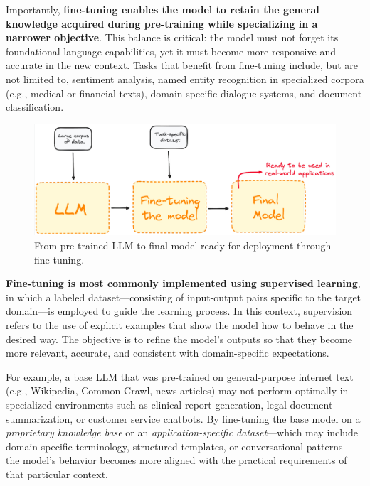Importantly, \textbf{fine-tuning enables the model to retain the general knowledge acquired during pre-training while specializing in a narrower objective}. This balance is critical: the model must not forget its foundational language capabilities, yet it must become more responsive and accurate in the new context. Tasks that benefit from fine-tuning include, but are not limited to, sentiment analysis, named entity recognition in specialized corpora (e.g., medical or financial texts), domain-specific dialogue systems, and document classification.


\vspace{1cm}

\begin{figure}[H]
    \centering
    \includegraphics[width=0.95\linewidth]{img/chap05/5.1.2.png}
    \caption{From pre-trained LLM to final model ready for deployment through fine-tuning.}
    \label{fig:finetune_overview_2}
\end{figure}

\textbf{Fine-tuning is most commonly implemented using supervised learning}, in which a labeled dataset—consisting of input-output pairs specific to the target domain—is employed to guide the learning process. In this context, supervision refers to the use of explicit examples that show the model how to behave in the desired way. The objective is to refine the model’s outputs so that they become more relevant, accurate, and consistent with domain-specific expectations.

\vspace{0.5cm}

For example, a base LLM that was pre-trained on general-purpose internet text (e.g., Wikipedia, Common Crawl, news articles) may not perform optimally in specialized environments such as clinical report generation, legal document summarization, or customer service chatbots. By fine-tuning the base model on a \emph{proprietary knowledge base} or an \emph{application-specific dataset}—which may include domain-specific terminology, structured templates, or conversational patterns—the model's behavior becomes more aligned with the practical requirements of that particular context.

